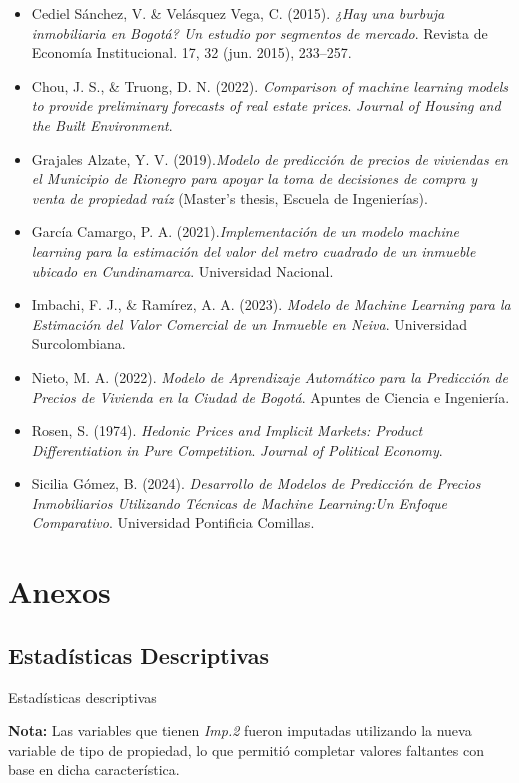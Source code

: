 \documentclass[a4paper]{article}
\theoremstyle{remark}
\theoremstyle{definition}
\begin{document}
\begin{itemize}
    \item Cediel Sánchez, V. \& Velásquez Vega, C. (2015).
    \textit{ ¿Hay una burbuja inmobiliaria en Bogotá? Un estudio por segmentos de mercado}. Revista de Economía Institucional. 17, 32 (jun. 2015), 233–257.
    \item Chou, J. S., \& Truong, D. N. (2022). \textit{Comparison of machine learning models to provide preliminary forecasts of real estate prices}. \textit{Journal of Housing and the Built Environment}.
    \item Grajales Alzate, Y. V. (2019).\textit{Modelo de predicción de precios de viviendas en el Municipio de Rionegro para apoyar la toma de decisiones de compra y venta de propiedad raíz} (Master's thesis, Escuela de Ingenierías).
    \item García Camargo, P. A. (2021).\textit{Implementación de un modelo machine learning para la estimación del valor del metro cuadrado de un inmueble ubicado en Cundinamarca}. Universidad Nacional.
    \item Imbachi, F. J., \& Ramírez, A. A. (2023). \textit{Modelo de Machine Learning para la Estimación del Valor Comercial de un Inmueble en Neiva}. Universidad Surcolombiana.
    \item Nieto, M. A. (2022). \textit{Modelo de Aprendizaje Automático para la Predicción de Precios de Vivienda en la Ciudad de Bogotá}. Apuntes de Ciencia e Ingeniería.
    \item Rosen, S. (1974). \textit{Hedonic Prices and Implicit Markets: Product Differentiation in Pure Competition}. \textit{Journal of Political Economy}.
    \item Sicilia Gómez, B. (2024). \textit{Desarrollo de Modelos de Predicción de Precios Inmobiliarios Utilizando Técnicas de Machine Learning:Un Enfoque Comparativo}. Universidad Pontificia Comillas.
\end{itemize}





\section{Anexos}

\subsection{Estadísticas Descriptivas}
\begin{table}[H]
    \centering
        \caption{Estadísticas descriptivas}
    \resizebox{\textwidth}{!}{%
        
    }
    \label{tabla_estadisticas}
    \begin{tablenotes}
        \footnotesize
        \item \textbf{Nota:} Las variables que tienen \textit{Imp.2} fueron imputadas utilizando la nueva variable de tipo de propiedad, lo que permitió completar valores faltantes con base en dicha característica.
    \end{tablenotes}
\end{table}
\end{document}
